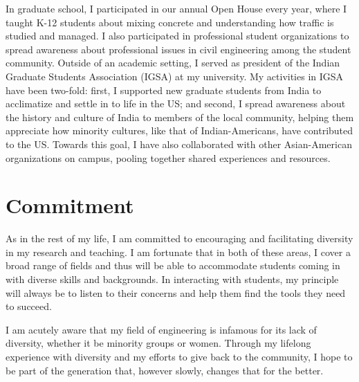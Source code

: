 \documentclass[12pt]{article}
\begin{document}
In graduate school, I participated in our annual Open House every year, where I taught K-12 students about mixing concrete and understanding how traffic is studied and managed. I also participated in professional student organizations to spread awareness about professional issues in civil engineering among the student community. Outside of an academic setting, I served as president of the Indian Graduate Students Association (IGSA) at my university. My activities in IGSA have been two-fold: first, I supported new graduate students from India to acclimatize and settle in to life in the US; and second, I spread awareness about the history and culture of India to members of the local community, helping them appreciate how minority cultures, like that of Indian-Americans, have contributed to the US. Towards this goal, I have also collaborated with other Asian-American organizations on campus, pooling together shared experiences and resources. 

\section*{Commitment}
As in the rest of my life, I am committed to encouraging and facilitating diversity in my research and teaching. I am fortunate that in both of these areas, I cover a broad range of fields and thus will be able to accommodate students coming in with diverse skills and backgrounds. In interacting with students, my principle will always be to listen to their concerns and help them find the tools they need to succeed.

I am acutely aware that my field of engineering is infamous for its lack of diversity, whether it be minority groups or women. Through my lifelong experience with diversity and my efforts to give back to the community, I hope to be part of the generation that, however slowly, changes that for the better. 
\end{document}
